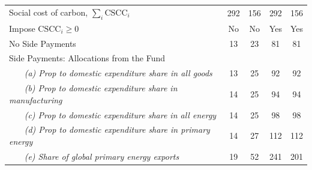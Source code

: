 \begin{center}
\small
\setlength{\tabcolsep}{20 pt} %
\renewcommand{\arraystretch}{1.25} %
\begin{tabular}{l cccc}
\hline
Social cost of carbon, $\sum_{i} \text{CSCC}_i$ & 292 & 156 & 292 & 156 \\
Impose $\text{CSCC}_i \ge 0$ & No & No & Yes & Yes \\
\hline
 No Side Payments & 13 & 23 & 81 & 81 \\
\multicolumn{5}{l}{Side Payments: Allocations from the Fund} \\
 ~~~ \textit{(a) Prop to domestic expenditure share in all goods} & 13 & 25 & 92 & 92 \\
 ~~~ \textit{(b) Prop to domestic expenditure share in manufacturing} & 14 & 25 & 94 & 94 \\
 ~~~ \textit{(c) Prop to domestic expenditure share in all energy} & 14 & 25 & 98 & 98 \\
 ~~~ \textit{(d) Prop to domestic expenditure share in primary energy} & 14 & 27 & 112 & 112 \\
 ~~~ \textit{(e) Share of global primary energy exports} & 19 & 52 & 241 & 201 \\
\hline
\end{tabular}
\end{center}
